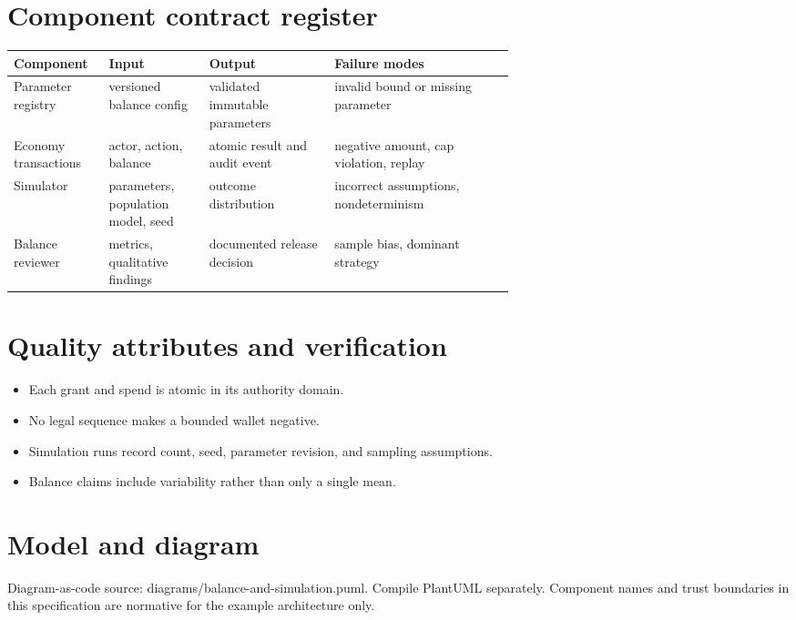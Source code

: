 \documentclass[11pt]{article}
\begin{document}
\section{Component contract register}
\begin{longtable}{@{}>{\raggedright\arraybackslash}p{0.19\linewidth}>{\raggedright\arraybackslash}p{0.20\linewidth}>{\raggedright\arraybackslash}p{0.25\linewidth}>{\raggedright\arraybackslash}p{}@{}}\toprule Component & Input & Output & Failure modes\\\midrule\endhead
Parameter registry & versioned balance config & validated immutable parameters & invalid bound or missing parameter \\
Economy transactions & actor, action, balance & atomic result and audit event & negative amount, cap violation, replay \\
Simulator & parameters, population model, seed & outcome distribution & incorrect assumptions, nondeterminism \\
Balance reviewer & metrics, qualitative findings & documented release decision & sample bias, dominant strategy \\
\bottomrule\end{longtable}

\section{Quality attributes and verification}
\begin{itemize}
\item Each grant and spend is atomic in its authority domain.
\item No legal sequence makes a bounded wallet negative.
\item Simulation runs record count, seed, parameter revision, and sampling assumptions.
\item Balance claims include variability rather than only a single mean.
\end{itemize}

\section{Model and diagram}
Diagram-as-code source: diagrams/balance-and-simulation.puml. Compile PlantUML separately. Component names and trust boundaries in this specification are normative for the example architecture only.
\end{document}
